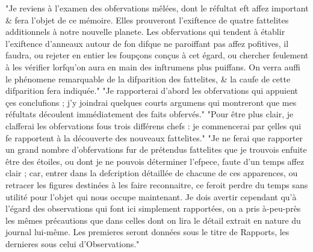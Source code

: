 "Je reviens à l'examen des obfervations mêlées, dont le réfultat eft affez important & fera l'objet de ce mémoire. Elles prouveront l'exiftence de quatre fattelites additionnels à notre nouvelle planete. Les obfervations qui tendent à établir l'exiftence d'anneaux autour de fon difque ne paroiffant pas affez pofitives, il faudra, ou rejeter en entier les foupçons conçus à cet égard, ou chercher feulement à les vérifier lorfqu'on aura en main des inftrumens plus puiffans. On verra auffi le phénomene remarquable de la difparition des fattelites, & la caufe de cette difparition fera indiquée."
"Je rapporterai d'abord les obfervations qui appuient çes conclufions ; j'y joindrai quelques courts argumens qui montreront que mes réfultats découlent immédiatement des faits obfervés."
"Pour être plus clair, je clafferai les obfervations fous trois différens chefs : je commencerai par çelles qui fe rapportent à la découverte des nouveaux fattelites."
"Je ne ferai que rapporter un grand nombre d'obfervations fur de prétendus fattelites que je trouvois enfuite être des étoiles, ou dont je ne pouvois déterminer l'efpece, faute d'un temps affez clair ; car, entrer dans la defcription détaillée de chacune de ces apparences,\setcounter{page}{102} ou retracer les figures destinées à les faire reconnaitre, ce feroit perdre du temps sans utilité pour l'objet qui nous occupe maintenant. Je dois avertir cependant qu'à l'égard des observations qui font ici simplement rapportées, on a pris à-peu-près les mêmes précautions que dans celles dont on lira le détail extrait en nature du journal lui-même. Les premieres seront données sous le titre de Rapports, les dernieres sous celui d'Observations."

